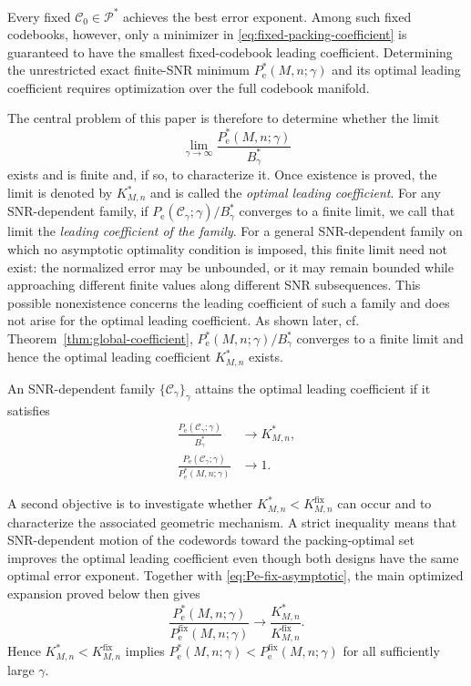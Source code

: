 \documentclass[12pt,draftclsnofoot,onecolumn]{IEEEtran}
\newcommand{\cC}{\mathcal{C}}
\newcommand{\cP}{\mathcal{P}}
\newcommand{\Pe}{P_{\mathrm e}}
\theoremstyle{definition}
\begin{document}
Every fixed \(\cC_0\in\cP^{\ast}\) achieves the best error exponent.
Among such fixed codebooks, however, only a minimizer in
\eqref{eq:fixed-packing-coefficient} is guaranteed to have the smallest
fixed-codebook leading coefficient.  Determining the unrestricted exact
finite-SNR minimum \(\Pe^{\ast}(M,n;\gamma)\) and its optimal leading coefficient
requires optimization over the full codebook manifold.

The central problem of this paper is therefore to determine whether the limit
\begin{equation}
  \lim_{\gamma\to\infty}
  \frac{\Pe^{\ast}(M,n;\gamma)}{B_\gamma^{\ast}}
  \label{eq:central-coefficient-problem}
\end{equation}
exists and is finite and, if so, to characterize it.  Once existence is
proved, the limit is
denoted by \(K^{\ast}_{M,n}\) and is called the \emph{optimal leading
coefficient}.  
For any SNR-dependent family, if
\(\Pe(\cC_\gamma;\gamma)/B_\gamma^{\ast}\) converges to a finite limit,
we call that limit the \emph{leading coefficient of the family}.  For a
general SNR-dependent family on which no asymptotic optimality condition
is imposed, this finite limit need not exist: the normalized error may be
unbounded, or it may remain bounded while approaching different finite
values along different SNR subsequences.  This possible nonexistence
concerns the leading coefficient of such a family and does not arise for
the optimal leading coefficient.  As shown later, cf.
Theorem~\ref{thm:global-coefficient},
\(\Pe^{\ast}(M,n;\gamma)/B_\gamma^{\ast}\) converges to a finite limit
and hence the optimal leading coefficient \(K^{\ast}_{M,n}\) exists.

  An
SNR-dependent family \(\{\cC_\gamma\}_\gamma\) attains the optimal leading
coefficient if it satisfies
\begin{equation}
\begin{aligned}
  \frac{\Pe(\cC_\gamma;\gamma)}{B_\gamma^{\ast}}
  &\longrightarrow K^{\ast}_{M,n},\\
  \frac{\Pe(\cC_\gamma;\gamma)}
  {\Pe^{\ast}(M,n;\gamma)}
  &\longrightarrow1.
\end{aligned}
  \label{eq:central-problem-attainment}
\end{equation}

A second objective is to investigate whether
\(K^{\ast}_{M,n}<K^{\mathrm{fix}}_{M,n}\) can occur and to characterize
the associated geometric mechanism.  A strict inequality means
that SNR-dependent motion of the codewords toward the packing-optimal set improves the
optimal leading coefficient even though both designs have the same optimal
error exponent.  Together with \eqref{eq:Pe-fix-asymptotic}, the main
optimized expansion proved below then gives
\begin{equation}
  \frac{\Pe^{\ast}(M,n;\gamma)}
       {\Pe^{\mathrm{fix}}(M,n;\gamma)}
  \longrightarrow
  \frac{K^{\ast}_{M,n}}{K^{\mathrm{fix}}_{M,n}}.
  \label{eq:Pe-star-Pe-fix-ratio}
\end{equation}
Hence \(K^{\ast}_{M,n}<K^{\mathrm{fix}}_{M,n}\) implies
\(\Pe^{\ast}(M,n;\gamma)<\Pe^{\mathrm{fix}}(M,n;\gamma)\) for all
sufficiently large \(\gamma\).
\end{document}
